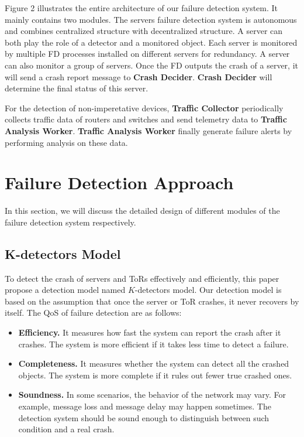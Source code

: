 \documentclass{sig-alternate-05-2015}
\begin{document}
Figure 2 illustrates the entire architecture of our failure detection system. It mainly contains two modules. The servers failure detection system is autonomous and combines centralized structure with decentralized structure. A server can both play the role of a detector and a monitored object. Each server is monitored by multiple FD processes installed on different servers for redundancy. A server can also monitor a group of servers. Once the FD outputs the crash of a server, it will send a crash report message to \textbf{Crash Decider}. \textbf{Crash Decider} will determine the final status of this server.

For the detection of non-imperetative devices, \textbf{Traffic Collector} periodically collects traffic data of routers and switches and send telemetry data to \textbf{Traffic Analysis Worker}. \textbf{Traffic Analysis Worker} finally generate failure alerts by performing analysis on these data.



\section{Failure Detection Approach}
In this section, we will discuss the detailed design of different modules of the failure detection system respectively.

\subsection{K-detectors Model}
To detect the crash of servers and ToRs effectively and efficiently, this paper propose a detection model named $K$-detectors model. Our detection model is based on the assumption that once the server or ToR crashes, it never recovers by itself. The QoS of failure detection are as follows:

\begin{itemize}
\item \textbf{Efficiency.} It measures how fast the system can report the crash after it crashes. The system is more efficient if it takes less time to detect a failure.
\item \textbf{Completeness.} It measures whether the system can detect all the crashed objects. The system is more complete if it rules out fewer true crashed ones.
\item \textbf{Soundness.} In some scenarios, the behavior of the network may vary. For example, message loss and message delay may happen sometimes. The detection system should be sound enough to distinguish between such condition and a real crash.

\end{itemize}
\end{document}

